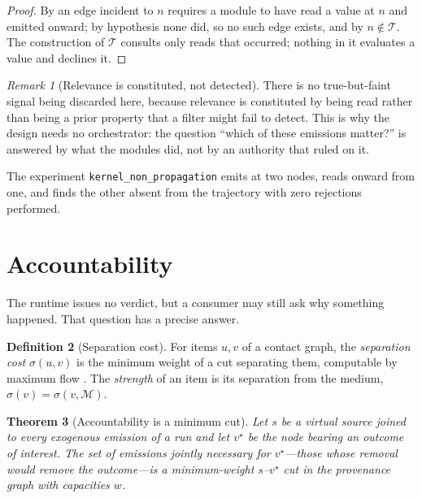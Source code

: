 \documentclass[11pt,twocolumn,a4paper]{article}
\newtheorem{theorem}{Theorem}[section]
\theoremstyle{definition}
\newtheorem{definition}[theorem]{Definition}
\theoremstyle{remark}
\newtheorem{remark}[theorem]{Remark}
\newcommand{\med}{\mathcal{M}}
\newcommand{\wt}{w}
\newcommand{\Traj}{\mathcal{T}}
\newcommand{\node}{n}
\begin{document}
\begin{proof}
By  an edge incident to $\node$ requires a module to have read a
value at $\node$ and emitted onward; by hypothesis none did, so no such edge
exists, and by  $\node\notin\Traj$. The construction of
$\Traj$ consults only reads that occurred; nothing in it evaluates a value and
declines it.
\end{proof}

\begin{remark}[Relevance is constituted, not detected]
\label{rem:constituted}
There is no true-but-faint signal being discarded here, because relevance is
constituted by being read rather than being a prior property that a filter might
fail to detect. This is why the design needs no orchestrator: the question
``which of these emissions matter?'' is answered by what the modules did, not by
an authority that ruled on it.
\end{remark}

The experiment \texttt{kernel\_non\_propagation} emits at two nodes, reads onward
from one, and finds the other absent from the trajectory with zero rejections
performed.

\section{Accountability}
\label{sec:accountability}

The runtime issues no verdict, but a consumer may still ask why something
happened. That question has a precise answer.

\begin{definition}[Separation cost]
\label{def:sep}
For items $u,v$ of a contact graph, the \emph{separation cost} $\sigma(u,v)$ is
the minimum weight of a cut separating them, computable by maximum flow
\citep{ford1956maximal,edmonds1972theoretical}. The \emph{strength} of an item is
its separation from the medium, $\sigma(v)=\sigma(v,\med)$.
\end{definition}

\begin{theorem}[Accountability is a minimum cut]
\label{thm:mincut}
Let $s$ be a virtual source joined to every exogenous emission of a run and let
$v^{\star}$ be the node bearing an outcome of interest. The set of emissions
jointly necessary for $v^{\star}$---those whose removal would remove the
outcome---is a minimum-weight $s$--$v^{\star}$ cut in the provenance graph with
capacities $\wt$.
\end{theorem}
\end{document}
